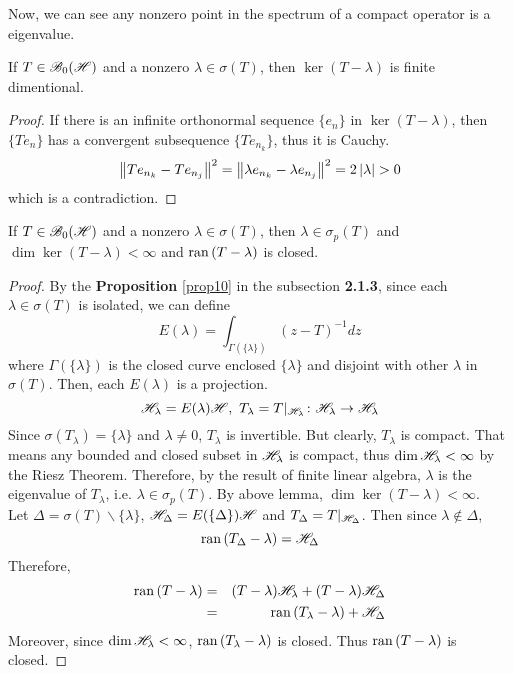 Now, we can see any nonzero point in the spectrum of a compact operator is a eigenvalue.

\begin{lem}
	If $T \in \mathscr{B}_{0}\mathscr{(H)}$ and a nonzero $\lambda \in \sigma(T)$, then $\ker{(T-\lambda)}$ is finite dimentional.
\end{lem}
\begin{proof}
	If there is an infinite orthonormal sequence $\{e_n\}$ in $\ker{(T-\lambda)}$, then $\{Te_n\}$ has a convergent subsequence $\{Te_{n_k}\}$, thus it is Cauchy.
	\begin{equation*}
		\left\lVert Te_{n_k}-Te_{n_j}\right\lVert^2 = \left\lVert\lambda e_{n_k}-\lambda e_{n_j}\right\lVert^2 = 2 \left\lvert\lambda\right\lvert > 0
	\end{equation*}
	which is a contradiction.
\end{proof}

\begin{thm} \label{thm12}
	If $T \in \mathscr{B}_{0}\mathscr{(H)}$ and a nonzero $\lambda \in \sigma(T)$, then $\lambda \in \sigma_p(T)$ and $\dim{\ker{(T-\lambda)}} < \infty$ and $\operatorname{ran}{(T-\lambda)}$ is closed.
\end{thm}
\begin{proof}
	By the \textbf{Proposition} \ref{prop10} in the subsection \textbf{2.1.3}, since each $\lambda \in \sigma(T)$ is isolated, we can define
	\begin{equation*}
		E(\lambda) = \int_{\Gamma(\{\lambda\})} (z-T)^{-1} dz 
	\end{equation*}
	where $\Gamma(\{\lambda\})$ is the closed curve enclosed $\{\lambda\}$ and disjoint with other $\lambda$ in $\sigma(T)$. Then, each $E(\lambda)$ is a projection.
	\begin{equation*}
		\mathscr{H}_{\lambda} = E(\lambda)\mathscr{H},~ T_{\lambda} = T|_{\mathscr{H}_{\lambda}} \colon \mathscr{H}_{\lambda} \rightarrow \mathscr{H}_{\lambda}
	\end{equation*}
	Since $\sigma(T_{\lambda}) = \{\lambda\}$ and $\lambda \neq 0$, $T_{\lambda}$ is invertible. But clearly, $T_{\lambda}$ is compact. That means any bounded and closed subset in $\mathscr{H}_{\lambda}$ is compact, thus $\dim{\mathscr{H}_{\lambda}} < \infty$ by the Riesz Theorem. Therefore, by the result of finite linear algebra, $\lambda$ is the eigenvalue of $T_{\lambda}$, i.e. $\lambda \in \sigma_p(T)$. By above lemma, $\dim{\ker{(T-\lambda)}} < \infty$.\\
	Let $\Delta = \sigma(T) \backslash \{\lambda\}$, $\mathscr{H}_{\Delta} = E(\{\Delta\})\mathscr{H}$ and $T_{\Delta} = T|_{\mathscr{H}_{\Delta}}$. Then since $\lambda \notin \Delta$,
	\begin{equation*}
		\operatorname{ran}{(T_{\Delta}-\lambda)} = \mathscr{H}_{\Delta}
	\end{equation*}
	Therefore, 
	\begin{eqnarray*}
		\operatorname{ran}{(T-\lambda)} &=& (T-\lambda)\mathscr{H}_{\lambda}+(T-\lambda)\mathscr{H}_{\Delta} \\
		&=& \operatorname{ran}{(T_{\lambda}-\lambda)} + \mathscr{H}_{\Delta}
	\end{eqnarray*}
	Moreover, since $\dim{\mathscr{H}_{\lambda}} < \infty$, $\operatorname{ran}{(T_{\lambda}-\lambda)}$ is closed. Thus $\operatorname{ran}{(T-\lambda)}$ is closed.
\end{proof}

